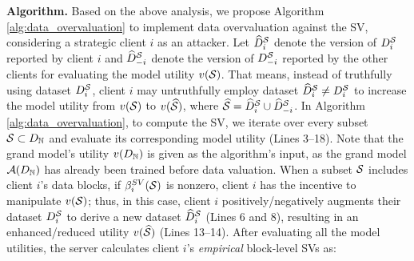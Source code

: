 \textbf{Algorithm.}
Based on the above analysis, we propose Algorithm \ref{alg:data_overvaluation} to implement data overvaluation against the SV, considering a strategic client $i$ as an attacker.
Let $\widehat{D}^{\mathcal{S}}_{i}$ denote the version of $D^{\mathcal{S}}_{i}$ reported by client $i$ and $\widehat{D}^{\mathcal{S}}_{-i}$ denote the version of $D^{\mathcal{S}}_{-i}$ reported by the other clients for evaluating the model utility $v(\mathcal{S})$.
That means, instead of truthfully using dataset $D^{\mathcal{S}}_{i}$, client $i$ may untruthfully employ dataset $\widehat{D}^{\mathcal{S}}_{i} \neq D^{\mathcal{S}}_{i}$ to increase the model utility from $v(\mathcal{S})$ to $v(\widehat{\mathcal{S}})$, where $\widehat{\mathcal{S}} = \widehat{D}^{\mathcal{S}}_{i} \cup \widehat{D}^{\mathcal{S}}_{-i}$.
In Algorithm \ref{alg:data_overvaluation}, to compute the SV, we iterate over every subset $\mathcal{S} \subset D_{\mathbb{N}}$ and evaluate its corresponding model utility (Lines 3--18).
Note that the grand model's utility $v(D_{\mathbb{N}})$ is given as the algorithm's input, as the grand model $\mathcal{A}(D_{\mathbb{N}})$ has already been trained before data valuation. 
When a subset $\mathcal{S}$ includes client $i$'s data blocks, if $\beta^{SV}_i(\mathcal{S})$ is nonzero, client $i$ has the incentive to manipulate $v(\mathcal{S})$; thus, in this case, client $i$ positively/negatively augments their dataset $D^{\mathcal{S}}_{i}$ to derive a new dataset $\widehat{D}^{\mathcal{S}}_{i}$ (Lines 6 and 8), resulting in an enhanced/reduced utility $v(\widehat{\mathcal{S}})$ (Lines 13--14).
After evaluating all the model utilities, the server calculates client $i$'s \textit{empirical} block-level SVs as:

